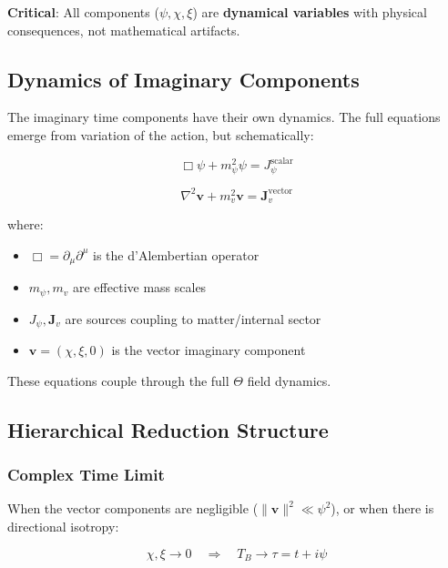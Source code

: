 \textbf{Critical}: All components ($\psi, \chi, \xi$) are \textbf{dynamical variables} with physical consequences, not mathematical artifacts.

\subsection{Dynamics of Imaginary Components}

The imaginary time components have their own dynamics. The full equations emerge from variation of the action, but schematically:

\begin{equation}
\label{eq:canonical:psi_dynamics}
\Box \psi + m_\psi^2 \psi = J_\psi^{\text{scalar}}
\end{equation}

\begin{equation}
\label{eq:canonical:vec_dynamics}
\nabla^2 \mathbf{v} + m_v^2 \mathbf{v} = \mathbf{J}_v^{\text{vector}}
\end{equation}

\noindent where:
\begin{itemize}
    \item $\Box = \partial_\mu\partial^\mu$ is the d'Alembertian operator
    \item $m_\psi, m_v$ are effective mass scales
    \item $J_\psi, \mathbf{J}_v$ are sources coupling to matter/internal sector
    \item $\mathbf{v} = (\chi, \xi, 0)$ is the vector imaginary component
\end{itemize}

These equations couple through the full $\Theta$ field dynamics.

\subsection{Hierarchical Reduction Structure}

\subsubsection{Complex Time Limit}

When the vector components are negligible ($\|\mathbf{v}\|^2 \ll \psi^2$), or when there is directional isotropy:

\begin{equation}
\label{eq:canonical:complex_limit}
\boxed{\chi, \xi \to 0 \quad \Rightarrow \quad T_B \to \tau = t + i\psi}
\end{equation}


